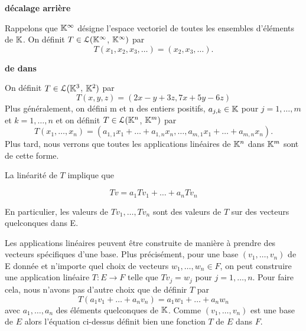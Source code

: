 \documentclass[12pt]{book}
\begin{document}
\noindent
\textbf{décalage arrière}
\begin{indpar}
Rappelons que $\mathbb{K}^{\infty}$ désigne l'espace vectoriel de toutes les ensembles d'éléments de $\mathbb{K}$. On définit $T \in \mathcal{L}(\mathbb{K}^{\infty}$, $\mathbb{K}^{\infty})$ par 
\begin{equation*}
    T(x_1, x_2, x_3, \ldots) = (x_2, x_3, \ldots).
\end{equation*}
\end{indpar}

\noindent 
\textbf{de  dans }
\begin{indpar}

On définit $T \in \mathcal{L}(\mathbb{K}^{3}$, $\mathbb{K}^{2})$ par 
\begin{equation}
    T(x, y, z) = (2x - y +3z, 7x + 5y -6z)
\end{equation}
Plus généralement, on défini m et n des entiers positifs, $a_{j,k} \in \mathbb{K}$ pour $j = 1, \ldots, m$ et $k = 1, \ldots, n$ et on définit $T \in \mathcal{L}(\mathbb{K}^{n}$, $\mathbb{K}^{m})$ par
\begin{equation*}
    T(x_1, \ldots, x_n) = (a_{1,1}x_1 + \ldots + a_{1,n}x_n, \ldots, a_{m,1}x_1 + \ldots + a_{m,n}x_n).
\end{equation*}
Plus tard, nous verrons que toutes les applications linéaires de $\mathbb{K}^n$ dans $\mathbb{K}^m$ sont de cette forme.
\end{indpar}

\smallskip{}
La linéarité de $T$ implique que

\begin{equation*}
    Tv = a_1Tv_1 + \ldots + a_nTv_n
\end{equation*}

\noindent
En particulier, les valeurs de $Tv_1,\ldots,Tv_n$ sont des valeurs de $T$ sur des vecteurs quelconques dans E.

Les applications linéaires peuvent être construite de manière à prendre des vecteurs spécifiques d'une base. Plus précisément, pour une base $(v_1,\ldots,v_n)$ de E donnée et n'importe quel choix de vecteurs $w_1,\ldots,w_n \in F$, on peut construire une application linéaire $T\colon E \rightarrow F$ telle que $Tv_j=w_j$ pour $j=1,\ldots,n$. Pour faire cela, nous n'avons pas d'autre choix que de définir $T$ par 
\begin{equation*}
    T(a_1v_1 + \ldots + a_nv_n) = a_1w_1 + \ldots + a_nw_n
\end{equation*}
\noindent
avec $a_1,\ldots,a_n$ des éléments quelconques de $\mathbb{K}$. Comme $(v_1,\ldots,v_n)$ est une base de $E$ alors l'équation ci-dessus définit bien une fonction $T$ de $E$ dans $F$.
\end{document}
